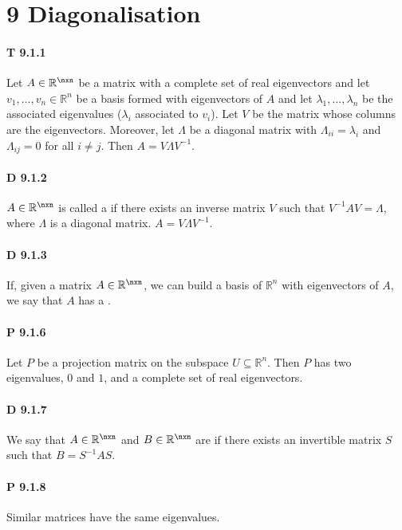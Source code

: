 \section*{9 Diagonalisation}

\paragraph{T 9.1.1} Let $A\in\mathbb{R}^{\nxn}$ be a matrix with a
complete set of real eigenvectors and let
$v_1,\dots,v_n\in\mathbb{R}^{n}$ be a basis formed with
eigenvectors of $A$ and let $\lambda_1,\dots,\lambda_n$ be the associated
eigenvalues ($\lambda_i$ associated to $v_i$). Let $V$ be the matrix
whose columns are the eigenvectors. Moreover, let $\Lambda$ be a diagonal
matrix with $\Lambda_{ii}=\lambda_{i}$ and $\Lambda_{ij}=0$ for all $i\not=j$.
Then $A=V\Lambda V^{-1}$.

\paragraph{D 9.1.2} $A\in\mathbb{R}^{\nxn}$ is called a  if there exists an inverse matrix $V$ such that $V^{-1}AV=\Lambda$, where $\Lambda$ is a diagonal matrix. $A=V\Lambda V^{-1}$.

\paragraph{D 9.1.3} If, given a matrix $A\in\mathbb{R}^{\nxn}$,
we can build a basis of $\mathbb{R}^n$ with eigenvectors of $A$, we say that
$A$ has a .

\paragraph{P 9.1.6} Let $P$ be a projection matrix on the subspace $U\subseteq \mathbb{R}^n$. Then $P$ has two eigenvalues, $0$ and $1$, and a complete set of real eigenvectors.

\paragraph{D 9.1.7} We say that $A\in\mathbb{R}^{\nxn}$ and
$B\in\mathbb{R}^{\nxn}$ are  if there exists an
invertible matrix $S$ such that $B=S^{-1}AS$.

\paragraph{P 9.1.8} Similar matrices have the same eigenvalues.

